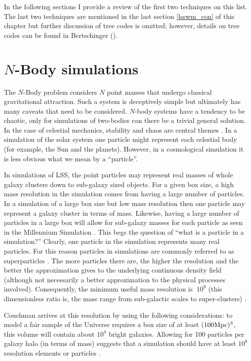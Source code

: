 \noindent In the following sections I provide a review of the first two techniques on this list. The last two techniques are mentioned in the last section \ref{lsswm_con} of this chapter but further discussion of tree codes is omitted; however, details on tree codes can be found in Bertschinger (\citeyear{bib_bert}).

\section{$N$-Body simulations}
\label{sec.dir_nb}
The $N$-Body problem considers $N$ point masses that undergo classical gravitational attraction. Such a system is deceptively simple but ultimately has many caveats that need to be considered. $N$-body systems have a tendency to be chaotic, only for simulations of two-bodies can there be a trivial general solution. In the case of celestial mechanics, stability and chaos are central themes \citep{bib_aar}. In a simulation of the solar system one particle might represent each celestial body (for example, the Sun and the planets). However, in a cosmological simulation it is less obvious what we mean by a ``particle''. \citep{bib_he, bib_hmpc}

In simulations of LSS, the point particles may represent real masses of whole galaxy clusters down to sub-galaxy sized objects. For a given box size, a high mass resolution in the simulation comes from having a large number of particles. In a simulation of a large box size but low mass resolution then one particle may represent a galaxy cluster in terms of mass. Likewise, having a large number of particles in a large box will allow for sub-galaxy masses for each particle as seen in the Millennium Simulation \citep{bib_spr}. This begs the question of ``what is a particle in a simulation?'' Clearly, one particle in the simulation represents many real particles. For this reason particles in simulations are commonly referred to as superparticles \citep{bib_he}. The more particles there are, the higher the resolution and the better the approximation gives to the underlying continuous density field (although not necessarily a better approximation to the physical processes involved). Consequently, the minimum useful mass resolution is $~10^9$ (this dimensionless ratio is, the mass range from sub-galactic scales to super-clusters) \citep{bib_hmpc}.

Couchman arrives at this resolution by using the following considerations: to model a fair sample of the Universe requires a box size of at least $(100 {\rm Mpc})^3$, this volume will contain about $10^4$ bright galaxies. Allowing for 100 particles per galaxy halo (in terms of mass) suggests that a simulation should have at least $10^8$ resolution elements or particles \citep{bib_hmpc3}.

